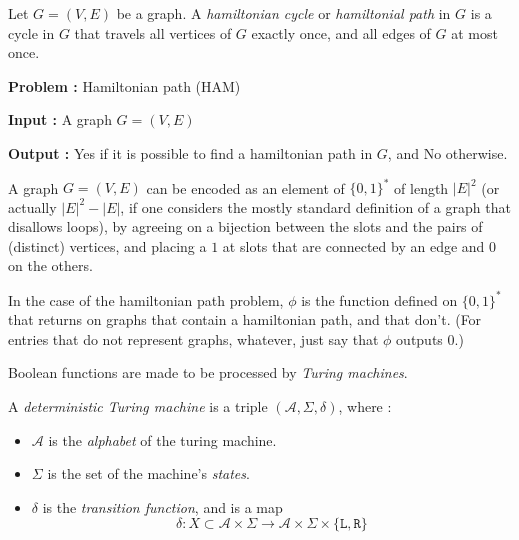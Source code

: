 \begin{definition}
    Let $ G = (V,E) $ be a graph. A \textit{hamiltonian cycle} or \textit{hamiltonial path} in $ G $ is a cycle in $ G $ that travels all vertices of $ G $ exactly once, and all edges of $ G $ at most once.
\end{definition}

\begin{problem}
    \textbf{Problem :} Hamiltonian path (HAM)

    \textbf{Input :} A graph $ G = (V,E) $

    \textbf{Output :} \og Yes \fg if it is possible to find a hamiltonian path in $ G $, and \og No \fg otherwise.
\end{problem}

A graph $ G = (V,E) $ can be encoded as an element of $ \{ 0,1 \}^* $ of length $ |E|^2 $ (or actually $ |E|^2 - |E| $, if one considers the mostly standard definition of a graph that disallows loops), by agreeing on a bijection between the slots and the pairs of (distinct) vertices, and placing a $ 1 $ at slots that are connected by an edge and $ 0 $ on the others.

In the case of the hamiltonian path problem, $ \phi $ is the function defined on $ \{ 0,1 \}^* $ that returns  \fg on graphs that contain a hamiltonian path, and  \fg that don't. (For entries that do not represent graphs, whatever, just say that $ \phi $ outputs 0.)

Boolean functions are made to be processed by \textit{Turing machines}.

\begin{definition}
    A \textit{deterministic Turing machine} is a triple $ (\mathcal A, \Sigma, \delta) $, where :
    \begin{itemize}
        \item $ \mathcal A $ is the \textit{alphabet} of the turing machine.
        \item $ \Sigma $ is the set of the machine's \textit{states}.
        \item $ \delta $ is the \textit{transition function}, and is a map
        \[
        \delta : X \subset \mathcal A \times \Sigma \to \mathcal A \times \Sigma \times \{ \texttt{L}, \texttt{R}\}
        \]
    \end{itemize}
\end{definition}

